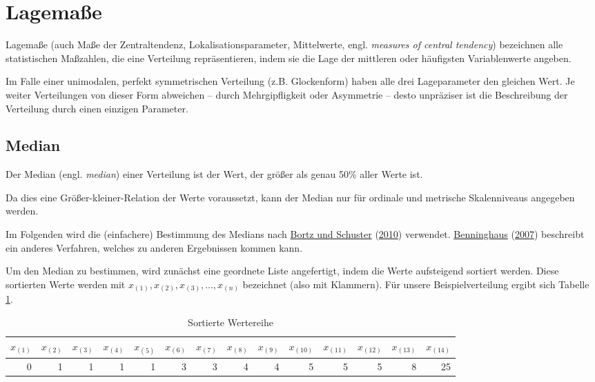 \documentclass[
  11pt,
  ngerman,
  a4paper,
]{report}
\begin{document}
\hypertarget{lagemauxdfe}{%
\section{Lagemaße}\label{lagemauxdfe}}

Lagemaße (auch Maße der Zentraltendenz, Lokalisationsparameter, Mittelwerte, engl. \emph{measures of central tendency}) bezeichnen alle statistischen Maßzahlen, die eine Verteilung repräsentieren, indem sie die Lage der mittleren oder häufigsten Variablenwerte angeben.

Im Falle einer unimodalen, perfekt symmetrischen Verteilung (z.B. Glockenform) haben alle drei Lageparameter den gleichen Wert. Je weiter Verteilungen von dieser Form abweichen -- durch Mehrgipfligkeit oder Asymmetrie -- desto unpräziser ist die Beschreibung der Verteilung durch einen einzigen Parameter.

\hypertarget{median}{%
\subsection{Median}\label{median}}

Der Median (engl. \emph{median}) einer Verteilung ist der Wert, der größer als genau 50\% aller Werte ist.

Da dies eine Größer-kleiner-Relation der Werte voraussetzt, kann der Median nur für ordinale und metrische Skalenniveaus angegeben werden.

Im Folgenden wird die (einfachere) Bestimmung des Medians nach \protect\hyperlink{ref-bortz}{Bortz und Schuster} (\protect\hyperlink{ref-bortz}{2010}) verwendet. \protect\hyperlink{ref-benninghaus}{Benninghaus} (\protect\hyperlink{ref-benninghaus}{2007}) beschreibt ein anderes Verfahren, welches zu anderen Ergebnissen kommen kann.

Um den Median zu bestimmen, wird zunächst eine geordnete Liste angefertigt, indem die Werte aufsteigend sortiert werden. Diese sortierten Werte werden mit \(x_{(1)}, x_{(2)}, x_{(3)}, ..., x_{(n)}\) bezeichnet (also mit Klammern). Für unsere Beispielverteilung ergibt sich Tabelle \ref{tab:sort}.

\begin{table}

\caption{\label{tab:sort}Sortierte Wertereihe}
\centering
\begin{tabular}[t]{rrrrrrrrrrrrrr}
\toprule
$x_{(1)}$ & $x_{(2)}$ & $x_{(3)}$ & $x_{(4)}$ & $x_{(5)}$ & $x_{(6)}$ & $x_{(7)}$ & $x_{(8)}$ & $x_{(9)}$ & $x_{(10)}$ & $x_{(11)}$ & $x_{(12)}$ & $x_{(13)}$ & $x_{(14)}$\\
\midrule
0 & 1 & 1 & 1 & 1 & 3 & 3 & 4 & 4 & 5 & 5 & 5 & 8 & 25\\
\bottomrule
\end{tabular}
\end{table}
\end{document}
